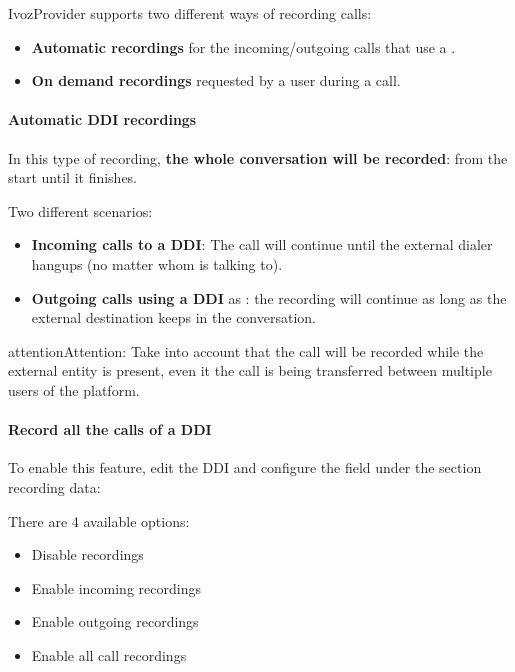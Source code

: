 \documentclass[letterpaper,10pt,english]{sphinxmanual}
\begin{document}
IvozProvider supports two different ways of recording calls:
\begin{itemize}
\item {} 
\textbf{Automatic recordings} for the incoming/outgoing calls that use a
{\hyperref[administration_portal/brand/views/ddis:ddis]{}}.

\item {} 
\textbf{On demand recordings} requested by a user during a call.

\end{itemize}


\paragraph{Automatic DDI recordings}
\label{administration_portal/client/residential/calls/call_recordings:automatic-ddi-recordings}
In this type of recording, \textbf{the whole conversation will be recorded}: from
the start until it finishes.

Two different scenarios:
\begin{itemize}
\item {} 
\textbf{Incoming calls to a DDI}: The call will continue until the external
dialer hangups (no matter whom is talking to).

\item {} 
\textbf{Outgoing calls using a DDI} as {\hyperref[administration_portal/brand/views/ddis:ddis]{}}: the
recording will continue as long as the external destination keeps in the
conversation.

\end{itemize}

\begin{notice}{attention}{Attention:}
Take into account that the call will be recorded while the
external entity is present, even it the call is being transferred between
multiple users of the platform.
\end{notice}
\paragraph{Record all the calls of a DDI}

To enable this feature, edit the DDI and configure the field under the section
recording data:

There are 4 available options:
\begin{itemize}
\item {} 
Disable recordings

\item {} 
Enable incoming recordings

\item {} 
Enable outgoing recordings

\item {} 
Enable all call recordings

\end{itemize}
\end{document}
